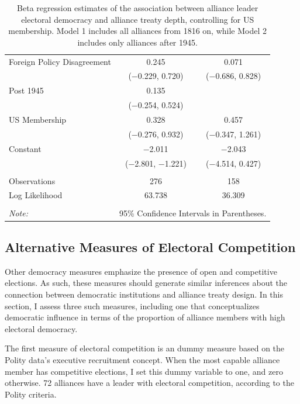 \documentclass[12pt]{article}
\begin{document}
\begin{table}[!htbp]
\begin{tabular}{@{\extracolsep{5pt}}lcc}
  Foreign Policy Disagreement & 0.245 & 0.071 \\ 
  & ($-$0.229, 0.720) & ($-$0.686, 0.828) \\ 
  Post 1945 & 0.135 &  \\ 
  & ($-$0.254, 0.524) &  \\ 
  US Membership & 0.328 & 0.457 \\ 
  & ($-$0.276, 0.932) & ($-$0.347, 1.261) \\ 
  Constant & $-$2.011$^{}$ & $-$2.043 \\ 
  & ($-$2.801, $-$1.221) & ($-$4.514, 0.427) \\ 
 \hline \\[-1.8ex] 
Observations & 276 & 158 \\ 
Log Likelihood & 63.738 & 36.309 \\ 
\hline 
\hline \\[-1.8ex] 
\textit{Note:}  & \multicolumn{2}{r}{95\% Confidence Intervals in Parentheses.} \\ 
\end{tabular} 
  \caption{Beta regression estimates of the association between alliance leader electoral democracy and alliance treaty depth, controlling for US membership. Model 1 includes all alliances from 1816 on, while Model 2 includes only alliances after 1945.} 
  \label{tab:us-reg}
\end{table} 


\subsection{Alternative Measures of Electoral Competition}


Other democracy measures emphasize the presence of open and competitive elections. 
As such, these measures should generate similar inferences about the connection between democratic institutions and alliance treaty design. 
In this section, I assess three such measures, including one that conceptualizes democratic influence in terms of the proportion of alliance members with high electoral democracy. 


The first measure of electoral competition is an dummy measure based on the Polity data's executive recruitment concept.  
When the most capable alliance member has competitive elections, I set this dummy variable to one, and zero otherwise. 
72 alliances have a leader with electoral competition, according to the Polity criteria. 
\end{document}

